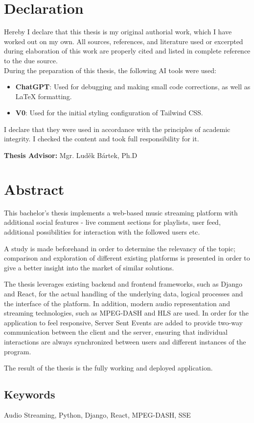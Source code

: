 \section*{Declaration}
Hereby I declare that this thesis is my original authorial work, which I have worked out on my own. All
sources, references, and literature used or excerpted during elaboration of this work are properly cited and
listed in complete reference to the due source.
\\
During the preparation of this thesis, the following AI tools were used:

\begin{itemize}
    \item \textbf{ChatGPT}: Used for debugging and making small code corrections, as well as LaTeX formatting.
    \item \textbf{V0}: Used for the initial styling configuration of Tailwind CSS.
\end{itemize}

I declare that they were used in accordance with the principles of academic integrity.
I checked the content and took full responsibility for it.

\vfill\noindent
\textbf{Thesis Advisor:} Mgr. Luděk Bártek, Ph.D
\cleardoublepage

\section*{Abstract}
This bachelor's thesis implements a web-based music streaming platform
with additional social features - live comment sections for playlists,
user feed, additional possibilities for interaction with the followed users etc.

A study is made beforehand in order to determine the relevancy of the topic;
comparison and exploration of different existing platforms is presented in order
to give a better insight into the market of similar solutions.

The thesis leverages existing backend and frontend frameworks, such as Django and React, for the
actual handling of the underlying data, logical processes and the interface of the platform.
In addition, modern audio representation and streaming technologies,
such as MPEG-DASH and HLS are used.
In order for the application to feel responsive, Server Sent Events are added to provide
two-way communication between the client and the server, ensuring that
individual interactions are always synchronized between users and different instances of the program.

The result of the thesis is the fully working and deployed application.

\subsection*{Keywords}
Audio Streaming, Python, Django, React, MPEG-DASH, SSE
